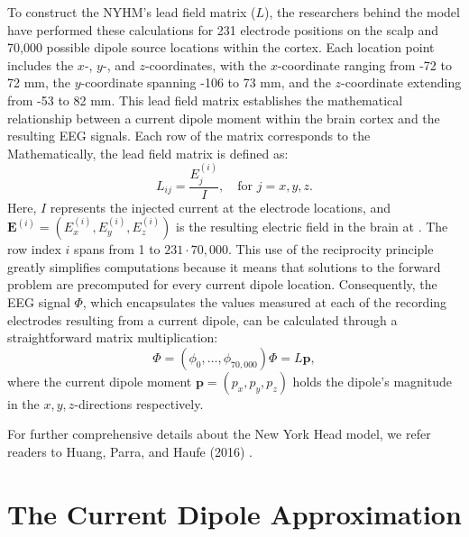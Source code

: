 \documentclass[a4paper, UKenglish, 11pt]{uiomaster}
\begin{document}

To construct the NYHM's lead field matrix (\(L\)), the researchers behind the model have performed these calculations for 231 electrode positions on the scalp and 70,000 possible dipole source locations within the cortex. Each location point includes the $x$-, $y$-, and $z$-coordinates, with the $x$-coordinate ranging from -72 to 72 mm, the $y$-coordinate spanning -106 to 73 mm, and the $z$-coordinate extending from -53 to 82 mm. This lead field matrix establishes the mathematical relationship between a current dipole moment within the brain cortex and the resulting EEG signals.
Each row of the matrix corresponds to the
Mathematically, the lead field matrix is defined as:
\begin{equation}
  L_{ij} = \frac{E_j^{(i)}}{I}, \quad \text{for } j = x, y, z.
  \label{eq:LeadFieldMatrix}
\end{equation}
Here, $I$ represents the injected current at the electrode locations, and $\mathbf{E}^{(i)} = (E_x^{(i)}, E_y^{(i)}, E_z^{(i)})$ is the resulting electric field in the brain at . The row index $i$ spans from 1 to $231 \cdot 70,000$. This use of the reciprocity principle greatly simplifies computations because it means that solutions to the forward problem are precomputed for every current dipole location. Consequently, the EEG signal $\Phi$, which encapsulates the values measured at each of the recording electrodes resulting from a current dipole, can be calculated through a straightforward matrix multiplication:
\begin{equation}
  \Phi = (\phi_0, \dots, \phi_{70,000})
  \Phi = L \mathbf{p},
  \label{eq:EEG_signal_matrix}
\end{equation}
where the current dipole moment $\mathbf{p} = (p_x, p_y, p_z)$ holds the dipole's magnitude in the \(x, y, z\)-directions respectively.

For further comprehensive details about the New York Head model, we refer readers to Huang, Parra, and Haufe (2016) \cite{huang2016new}.


\section{The Current Dipole Approximation}
\end{document}
